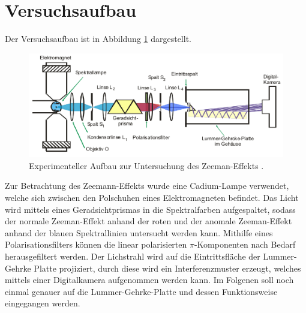 \section{Versuchsaufbau}
Der Versuchsaufbau ist in Abbildung \ref{fig:tfig5} dargestellt.
\FloatBarrier
\begin{figure}
\centering
\includegraphics[width=\textwidth]{aufbau.png}
\caption{Experimenteller Aufbau zur Untersuchung des Zeeman-Effekts \cite{quelle02}.}
\label{fig:tfig5}
\end{figure}
\FloatBarrier
Zur Betrachtung des Zeemann-Effekts wurde eine Cadium-Lampe verwendet, welche sich zwischen den Polschuhen eines Elektromagneten befindet. 
Das Licht wird mittels eines Geradsichtprismas in die Spektralfarben aufgespaltet, sodass der normale
Zeeman-Effekt anhand der roten und der anomale Zeeman-Effekt anhand der blauen Spektrallinien untersucht werden kann. Mithilfe eines Polarisationsfilters können die linear polarisierten $\pi$-Komponenten
nach Bedarf herausgefiltert werden. Der Lichstrahl wird auf die Eintrittsfläche der Lummer-Gehrke Platte projiziert, durch diese wird ein Interferenzmuster erzeugt, 
welches mittels einer Digitalkamera aufgenommen werden kann. Im Folgenen soll noch einmal genauer auf die Lummer-Gehrke-Platte und dessen Funktionsweise eingegangen werden.

